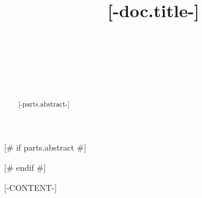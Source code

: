 \documentclass[qe,nameyear,draft]{econsocart}
[# else #]
\begin{document}
\begin{frontmatter}

\title{[-doc.title-]}

\begin{aug}
%
%
%
\author[id=au1,addressref={add1,add11}]{~}
\author[id=au2,addressref={add2}]{~}
\author[id=au3,addressref={add2}]{~}
\address[id=add1]{%
,
}

\address[id=add11]{%
,
}

\address[id=add2]{%
,
}
\end{aug}

%
[# if parts.abstract #]
\begin{abstract}
[-parts.abstract-]
\end{abstract}
[# endif #]

\begin{keyword}
\end{keyword}

\begin{keyword}[class=JEL] %
\end{keyword}

\end{frontmatter}

[-CONTENT-]

%
\end{document}
